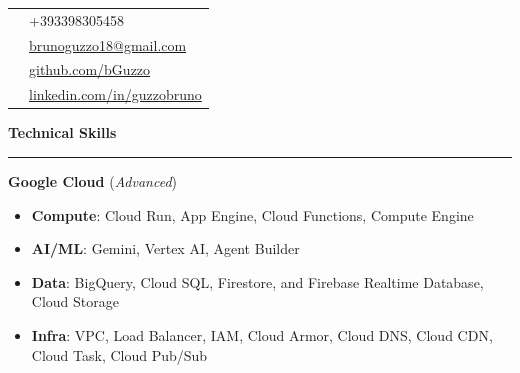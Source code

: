 \documentclass[9pt, a4paper]{article}
\newcommand{\cvsection}[1]{%
	\vspace{2pt}\par
	{\Large\bfseries\color{sectionblue}#1}\par
	\vspace{2pt}\hrule\vspace{6pt}
}
\begin{document}
	\begin{minipage}[t]{0.32\linewidth}
		\vspace{0pt} %
		
		\begin{center}
		\end{center}
		
		\begin{tabularx}{\linewidth}{@{}lX@{}}
			\faPhone & +393398305458 \\
			\faEnvelope & \href{mailto:brunoguzzo18@gmail.com}{brunoguzzo18@gmail.com} \\
			\faGithub & \href{https://github.com/bGuzzo}{github.com/bGuzzo} \\
			\faLinkedin & \href{https://www.linkedin.com/in/guzzobruno/}{linkedin.com/in/guzzobruno} \\
		\end{tabularx}
		\vspace{4pt}
		
		\cvsection{Technical Skills}
		
		{\bfseries Google Cloud} (\textit{Advanced})
		\begin{itemize}[leftmargin=*, nosep, itemsep=2pt]
			\footnotesize
			\item \textbf{Compute}: Cloud Run, App Engine, Cloud Functions, Compute Engine
			\item \textbf{AI/ML}: Gemini, Vertex AI, Agent Builder
			\item \textbf{Data}: BigQuery, Cloud SQL, Firestore, and Firebase Realtime Database, Cloud Storage
			\item \textbf{Infra}: VPC, Load Balancer, IAM, Cloud Armor, Cloud DNS, Cloud CDN, Cloud Task, Cloud Pub/Sub
		\end{itemize}
		\vspace{4pt}
		

\end{minipage}
\end{document}
